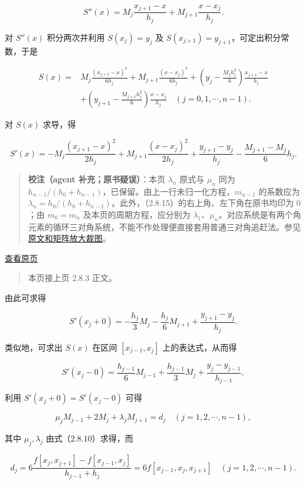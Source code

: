 \documentclass[
  10pt,
  fontset=fandol]{ctexart}
\begin{document}
\[S''(x)=M_j\frac{x_{j+1}-x}{h_j}+M_{j+1}\frac{x-x_j}{h_j}.\tag{2.8.16}\]

对 \(S''(x)\) 积分两次并利用 \(S(x_j)=y_j\) 及 \(S(x_{j+1})=y_{j+1}\)，可定出积分常数，于是

\[\begin{aligned}
S(x)={}&M_j\frac{(x_{j+1}-x)^3}{6h_j}+M_{j+1}\frac{(x-x_j)^3}{6h_j}+\left(y_j-\frac{M_jh_j^2}6\right)\frac{x_{j+1}-x}{h_j}\\
&+\left(y_{j+1}-\frac{M_{j+1}h_j^2}6\right)\frac{x-x_j}{h_j}\quad(j=0,1,\cdots,n-1).
\end{aligned}\tag{2.8.17}\]

对 \(S(x)\) 求导，得

\[S'(x)=-M_j\frac{(x_{j+1}-x)^2}{2h_j}+M_{j+1}\frac{(x-x_j)^2}{2h_j}+\frac{y_{j+1}-y_j}{h_j}-\frac{M_{j+1}-M_j}6h_j.\tag{2.8.18}\]

\begin{quote}
\textbf{校注（agent 补充；原书疑误）}：本页 \(\lambda_n\) 原式与 \(\mu_n\) 同为 \(h_{n-1}/(h_0+h_{n-1})\)，已保留。由上一行未归一化方程，\(m_{n-1}\) 的系数应为 \(\lambda_n=h_0/(h_0+h_{n-1})\)。此外，（2.8.15）的右上角、左下角在原书均印为 \(0\)；由 \(m_0=m_n\) 及本页的周期方程，应分别为 \(\lambda_1\)、\(\mu_n\)。对应系统是有两个角元素的循环三对角系统，不能不作处理便直接套用普通三对角追赶法。参见\href{../assets/ch02b/pdf-052-periodic-system-detail.png}{原文和矩阵放大裁图}。
\end{quote}

\href{../../source-images/pdf-053.jpeg}{查看原页}

\begin{quote}
本页接上页 2.8.3 正文。
\end{quote}

由此可求得

\[S'(x_j+0)=-\frac{h_j}3M_j-\frac{h_j}6M_{j+1}+\frac{y_{j+1}-y_j}{h_j}.\]

类似地，可求出 \(S(x)\) 在区间 \([x_{j-1},x_j]\) 上的表达式，从而得

\[S'(x_j-0)=\frac{h_{j-1}}6M_{j-1}+\frac{h_{j-1}}3M_j+\frac{y_j-y_{j-1}}{h_{j-1}},\]

利用 \(S'(x_j+0)=S'(x_j-0)\) 可得

\[\mu_jM_{j-1}+2M_j+\lambda_jM_{j+1}=d_j\quad(j=1,2,\cdots,n-1),\tag{2.8.19}\]

其中 \(\mu_j,\lambda_j\) 由式（2.8.10）求得，而

\[d_j=6\frac{f[x_j,x_{j+1}]-f[x_{j-1},x_j]}{h_{j-1}+h_j}=6f[x_{j-1},x_j,x_{j+1}]\quad(j=1,2,\cdots,n-1).\tag{2.8.20}\]
\end{document}
